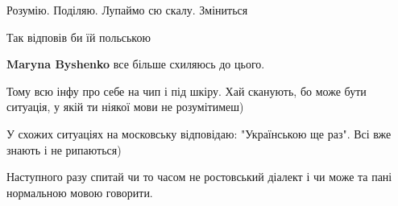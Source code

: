 \begin{itemize}
 
Розумію. Поділяю. Лупаймо сю скалу. Зміниться

 
Так відповів би їй польською

\begin{itemize}
 
\textbf{Maryna Byshenko} все більше схиляюсь до цього.
\end{itemize}

 
Тому всю інфу про себе на чип і під шкіру. Хай сканують, бо може бути ситуація, у якій ти ніякої мови не розумітимеш)

 
У схожих ситуаціях на московську відповідаю: "Українською ще раз". Всі вже знають і не рипаються)

 
Наступного разу спитай чи то часом не ростовський діалект і чи може та пані нормальною мовою говорити.


\end{itemize}
